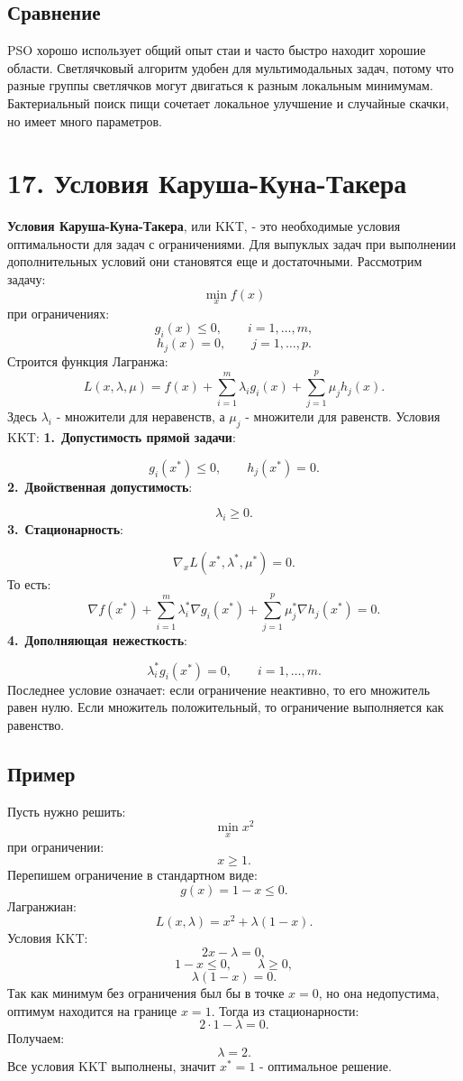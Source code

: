 \documentclass[12pt,a4paper]{article}
\begin{document}
\subsection{Сравнение}
PSO хорошо использует общий опыт стаи и часто быстро находит хорошие области.
Светлячковый алгоритм удобен для мультимодальных задач, потому что разные группы светлячков могут двигаться к разным локальным минимумам.
Бактериальный поиск пищи сочетает локальное улучшение и случайные скачки, но имеет много параметров.

\section{17. Условия Каруша-Куна-Такера}
\textbf{Условия Каруша-Куна-Такера}, или KKT, - это необходимые условия оптимальности для задач с ограничениями. Для выпуклых задач при выполнении дополнительных условий они становятся еще и достаточными.
Рассмотрим задачу:
\[
\min_x f(x)
\]
при ограничениях:
\[
g_i(x)\le 0,\qquad i=1,\ldots,m,
\]
\[
h_j(x)=0,\qquad j=1,\ldots,p.
\]
Строится функция Лагранжа:
\[
L(x,\lambda,\mu)=f(x)+\sum_{i=1}^m\lambda_i g_i(x)+\sum_{j=1}^p\mu_j h_j(x).
\]
Здесь $\lambda_i$ - множители для неравенств, а $\mu_j$ - множители для равенств.
Условия KKT:
\noindent\textbf{1.}\ \textbf{Допустимость прямой задачи}:\par
\[
g_i(x^*)\le 0,\qquad h_j(x^*)=0.
\]
\noindent\textbf{2.}\ \textbf{Двойственная допустимость}:\par
\[
\lambda_i\ge 0.
\]
\noindent\textbf{3.}\ \textbf{Стационарность}:\par
\[
\nabla_x L(x^*,\lambda^*,\mu^*)=0.
\]
То есть:
\[
\nabla f(x^*)+\sum_{i=1}^m\lambda_i^*\nabla g_i(x^*)+\sum_{j=1}^p\mu_j^*\nabla h_j(x^*)=0.
\]
\noindent\textbf{4.}\ \textbf{Дополняющая нежесткость}:\par
\[
\lambda_i^*g_i(x^*)=0,\qquad i=1,\ldots,m.
\]
Последнее условие означает: если ограничение неактивно, то его множитель равен нулю. Если множитель положительный, то ограничение выполняется как равенство.
\subsection{Пример}
Пусть нужно решить:
\[
\min_x x^2
\]
при ограничении:
\[
x\ge 1.
\]
Перепишем ограничение в стандартном виде:
\[
g(x)=1-x\le 0.
\]
Лагранжиан:
\[
L(x,\lambda)=x^2+\lambda(1-x).
\]
Условия KKT:
\[
2x-\lambda=0,
\]
\[
1-x\le 0,\qquad \lambda\ge 0,
\]
\[
\lambda(1-x)=0.
\]
Так как минимум без ограничения был бы в точке $x=0$, но она недопустима, оптимум находится на границе $x=1$.
Тогда из стационарности:
\[
2\cdot 1-\lambda=0.
\]
Получаем:
\[
\lambda=2.
\]
Все условия KKT выполнены, значит $x^*=1$ - оптимальное решение.
\end{document}
